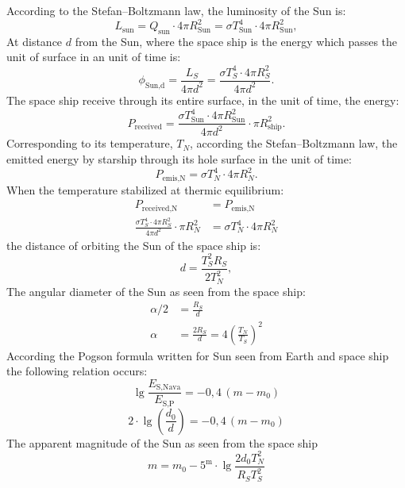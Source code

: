 According to the Stefan--Boltzmann law, the luminosity of the Sun is:
\begin{equation*}
L_{\text{sun}} = Q_{\text{sun}} \cdot 4\pi R_{\text{Sun}}^2
  = \sigma T_{\text{Sun}}^4 \cdot 4\pi R_{\text{Sun}}^2, \tag{1}
\end{equation*}
At distance $d$ from the Sun, where the space ship is the energy which passes
the unit of surface in an unit of time is:
\begin{equation*}
\phi_{\text{Sun,d}} = \frac{L_S}{4\pi d^2}
  = \frac{\sigma T_S^4 \cdot 4\pi R_S^2}{4\pi d^2}. \tag{2}
\end{equation*}
The space ship receive through its entire surface, in the unit of time, the
energy:
\[
P_{\text{received}} = \frac{\sigma T_{\text{Sun}}^4 \cdot 4\pi R_{\text{Sun}}^2}{4\pi d^2}
  \cdot \pi R_{\text{ship}}^2.
\]
Corresponding to its temperature, $T_N$, according the Stefan--Boltzmann law,
the emitted energy by starship through its hole surface %
in the unit of time:
\[
P_{\text{emis,N}} = \sigma T_N^4 \cdot 4\pi R_N^2.
\]
When the temperature stabilized at thermic equilibrium:
\begin{align*}
P_{\text{received,N}} &= P_{\text{emis,N}}\\
\frac{\sigma T_S^4 \cdot 4\pi R_S^2}{4\pi d^2} \cdot \pi R_N^2
  &= \sigma T_N^4 \cdot 4\pi R_N^2
\end{align*}
the distance of orbiting the Sun of the space ship is:
\[
d = \frac{T_S^2 R_S}{2 T_N^2},
\]
The angular diameter of the Sun as seen from the space ship:
\begin{align*}
\alpha/2 &= \frac{R_S}{d}\\
\alpha &= \frac{2 R_S}{d} = 4 \left( \frac{T_N}{T_S} \right)^{\!2}
\end{align*}
According the Pogson formula written for Sun seen from Earth and space ship
the following relation occurs:
\begin{equation*}
\lg \frac{E_{\text{S,Nava}}}{E_{\text{S,P}}} = -0{,}4\,(m - m_0) \tag{2}
\end{equation*}
\[
2 \cdot \lg\!\left( \frac{d_0}{d} \right) = -0{,}4\,(m - m_0)
\]
The apparent magnitude of the Sun as seen from the space ship
\[
m = m_0 - 5^{\mathrm{m}} \cdot \lg \frac{2 d_0 T_N^2}{R_S T_S^2}
\]
